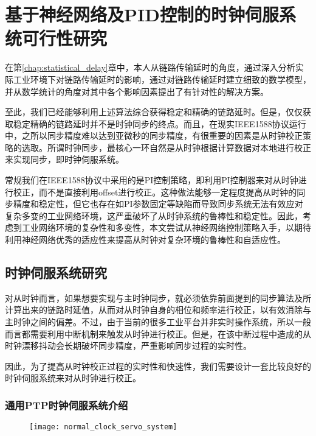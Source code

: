
\chapter{基于神经网络及PID控制的时钟伺服系统可行性研究}
在第\ref{chap:statistical_delay}章中，本人从链路传输延时的角度，通过深入分析实际工业环境下对链路传输延时的影响，通过对链路传输延时建立细致的数学模型，并从数学统计的角度对其中各个影响因素提出了有针对性的解决方案。

至此，我们已经能够利用上述算法综合获得稳定和精确的链路延时。但是，仅仅获取稳定精确的链路延时并不是时钟同步的终点。而且，在现实IEEE1588协议运行中，之所以同步精度难以达到亚微秒的同步精度，有很重要的因素是从时钟校正策略的选取。所谓时钟同步，最核心一环自然是从时钟根据计算数据对本地进行校正来实现同步，即时钟伺服系统。

常规我们在IEEE1588协议中采用的是PI控制策略，即利用PI控制器来对从时钟进行校正，而不是直接利用offset进行校正。这种做法能够一定程度提高从时钟的同步精度和稳定性，但它也存在如PI参数固定等缺陷而导致同步系统无法有效应对复杂多变的工业网络环境，这严重破坏了从时钟系统的鲁棒性和稳定性。因此，考虑到工业网络环境的复杂性和多变性，本文尝试从神经网络控制策略入手，以期待利用神经网络优秀的适应性来提高从时钟对复杂环境的鲁棒性和自适应性。

\section{时钟伺服系统研究}
对从时钟而言，如果想要实现与主时钟同步，就必须依靠前面提到的同步算法及所计算出来的链路时延值，从而对从时钟自身的相位和频率进行校正，以有效消除与主时钟之间的偏差。不过，由于当前的很多工业平台并非实时操作系统，所以一般而言都需要利用中断机制来触发从时钟进行校正。但是，在该中断过程中造成的从时钟漂移抖动会长期破坏同步精度，严重影响同步过程的实时性。

因此，为了提高从时钟校正过程的实时性和快速性，我们需要设计一套比较良好的时钟伺服系统来对从时钟进行校正。

\subsection{通用PTP时钟伺服系统介绍}

\begin{figure}[!hbp]
  \centering
  \begin{minipage}[b]{0.7\textwidth}
    \captionstyle{\centering}
    \centering
    \texttt{[image: normal\_clock\_servo\_system]}
  \end{minipage}     
\end{figure}

